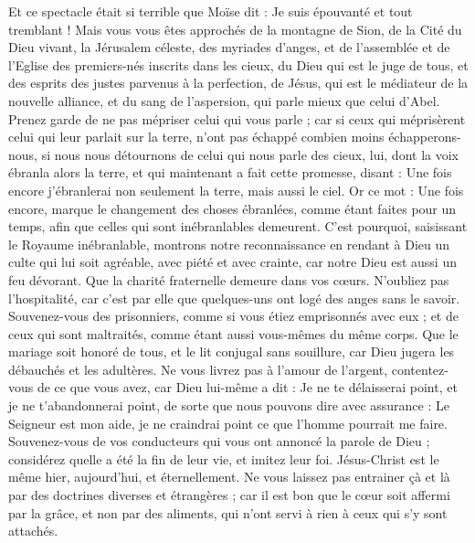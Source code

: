 \begin{multicols}{2}
Et ce spectacle était si terrible que Moïse dit : Je suis épouvanté et tout tremblant !
Mais vous vous êtes approchés de la montagne de Sion, de la Cité du Dieu vivant, la Jérusalem céleste, des myriades d'anges,
et de l'assemblée et de l'Eglise des premiers-nés inscrits dans les cieux, du Dieu qui est le juge de tous, et des esprits des justes parvenus à la perfection,
de Jésus, qui est le médiateur de la nouvelle alliance, et du sang de l'aspersion, qui parle mieux que celui d'Abel.
Prenez garde de ne pas mépriser celui qui vous parle ; car si ceux qui méprisèrent celui qui leur parlait sur la terre, n’ont pas échappé combien moins échapperons-nous, si nous nous détournons de celui qui nous parle des cieux,
lui, dont la voix ébranla alors la terre, et qui maintenant a fait cette promesse, disant : Une fois encore j'ébranlerai non seulement la terre, mais aussi le ciel.
Or ce mot : Une fois encore, marque le changement des choses ébranlées, comme étant faites pour un temps, afin que celles qui sont inébranlables demeurent.
C'est pourquoi, saisissant le Royaume inébranlable, montrons notre reconnaissance en rendant à Dieu un culte qui lui soit agréable, avec piété et avec crainte,
car notre Dieu est aussi un feu dévorant.
\VerseOne{}Que la charité fraternelle demeure dans vos cœurs.
N'oubliez pas l'hospitalité, car c’est par elle que quelques-uns ont logé des anges sans le savoir.
Souvenez-vous des prisonniers, comme si vous étiez emprisonnés avec eux ; et de ceux qui sont maltraités, comme étant aussi vous-mêmes du même corps.
Que le mariage soit honoré de tous, et le lit conjugal sans souillure, car Dieu jugera les débauchés et les adultères.
Ne vous livrez pas à l’amour de l’argent, contentez-vous de ce que vous avez, car Dieu lui-même a dit : Je ne te délaisserai point, et je ne t'abandonnerai point,
de sorte que nous pouvons dire avec assurance : Le Seigneur est mon aide, je ne craindrai point ce que l'homme pourrait me faire.
Souvenez-vous de vos conducteurs qui vous ont annoncé la parole de Dieu ; considérez quelle a été la fin de leur vie, et imitez leur foi.
Jésus-Christ est le même hier, aujourd'hui, et éternellement.
Ne vous laissez pas entrainer çà et là par des doctrines diverses et étrangères ; car il est bon que le cœur soit affermi par la grâce, et non par des aliments, qui n'ont servi à rien à ceux qui s'y sont attachés.

\end{multicols}
